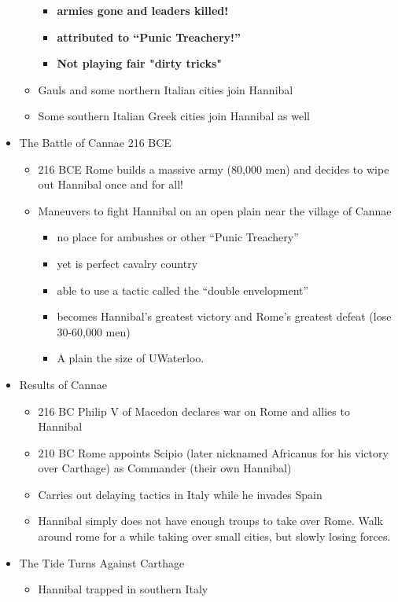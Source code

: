 \documentclass[12pt, twoside]{article}
\begin{document}
\begin{itemize}
\begin{itemize}
\begin{itemize}
		\item \textbf{armies gone and leaders killed!}
		\item \textbf{attributed to “Punic Treachery!”}
		\item \textbf{Not playing fair "dirty tricks"}
		\end{itemize}
	\item Gauls and some northern Italian cities join Hannibal
	\item Some southern Italian Greek cities join Hannibal as well
	\end{itemize}
\item The Battle of Cannae 216 BCE
	\begin{itemize}
	\item 216 BCE Rome builds a massive army (80,000 men) and decides to wipe out Hannibal once and for all!
	\item Maneuvers to fight Hannibal on an open plain near the village of Cannae
		\begin{itemize}
		\item no place for ambushes or other “Punic Treachery”
		\item yet is perfect cavalry country
		\item able to use a tactic called the “double envelopment”
		\item becomes Hannibal’s greatest victory and Rome’s greatest defeat (lose 30-60,000 men)
		\item A plain the size of UWaterloo.
		\end{itemize}
	\end{itemize}
\item Results of Cannae
	\begin{itemize}
	\item 216 BC Philip V of Macedon declares war on Rome and allies to Hannibal
	\item 210 BC Rome appoints Scipio (later nicknamed Africanus for his victory over Carthage) as Commander (their own Hannibal)
	\item Carries out delaying tactics in Italy while he invades Spain
	\item Hannibal simply does not have enough troups to take over Rome.  Walk around rome for a while taking over small cities, but slowly losing forces.
	\end{itemize}
\item The Tide Turns Against Carthage
	\begin{itemize}
	\item Hannibal trapped in southern Italy

\end{itemize}
\end{itemize}
\end{document}

